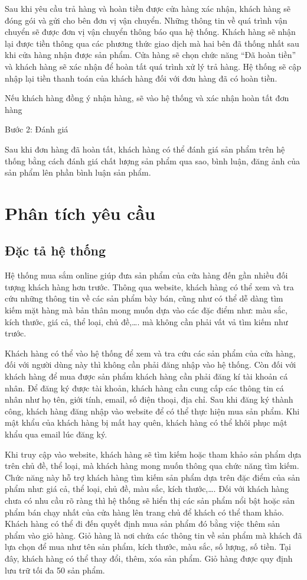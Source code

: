 \documentclass[12pt,a4paper,2sides]{report}
\begin{document}
Sau khi yêu cầu trả hàng và hoàn tiền được cửa hàng xác nhận, khách hàng sẽ đóng gói và gửi cho bên đơn vị vận chuyển. Những thông tin về quá trình vận chuyển sẽ được đơn vị vận chuyển thông báo qua hệ thống. Khách hàng sẽ nhận lại được tiền thông qua các phương thức giao dịch mà hai bên đã thống nhất sau khi cửa hàng nhận được sản phẩm. Cửa hàng sẽ chọn chức năng “Đã hoàn tiền” và khách hàng sẽ xác nhận để hoàn tất quá trình xử lý trả hàng. Hệ thống sẽ cập nhập lại tiền thanh toán của khách hàng đối với đơn hàng đã có hoàn tiền.

Nếu khách hàng đồng ý nhận hàng, sẽ vào hệ thống và xác nhận hoàn tất đơn hàng

Bước 2: Đánh giá

Sau khi đơn hàng đã hoàn tất, khách hàng có thể đánh giá sản phẩm trên hệ thống bằng cách đánh giá chất lượng sản phẩm qua sao, bình luận, đăng ảnh của sản phẩm lên phần bình luận sản phẩm.

\section{Phân tích yêu cầu}
\subsection{Đặc tả hệ thống}
Hệ thống mua sắm online giúp đưa sản phẩm của cửa hàng đến gần nhiều đối tượng khách hàng hơn trước. Thông qua website, khách hàng có thể xem và tra cứu những thông tin về các sản phẩm bày bán, cũng như có thể dễ dàng tìm kiếm mặt hàng mà bản thân mong muốn dựa vào các đặc điểm như: màu sắc, kích thước, giá cả, thể loại, chủ đề,…. mà không cần phải vất vả tìm kiếm như trước.

Khách hàng có thể vào hệ thống để xem và tra cứu các sản phẩm của cửa hàng, đối với người dùng này thì không cần phải đăng nhập vào hệ thống. Còn đối với khách hàng để mua được sản phẩm khách hàng cần phải đăng kí tài khoản cá nhân. Để đăng ký được tài khoản, khách hàng cần cung cấp các thông tin cá nhân như họ tên, giới tính, email, số điện thoại, địa chỉ. Sau khi đăng ký thành công, khách hàng đăng nhập vào website để có thể thực hiện mua sản phẩm. Khi mật khẩu của khách hàng bị mất hay quên, khách hàng có thể khôi phục mật khẩu qua email lúc đăng ký.

Khi truy cập vào website, khách hàng sẽ tìm kiếm hoặc tham khảo sản phẩm dựa trên chủ đề, thể loại, mà khách hàng mong muốn thông qua chức năng tìm kiếm. Chức năng này hỗ trợ khách hàng tìm kiếm sản phẩm dựa trên đặc điểm của sản phẩm như: giá cả, thể loại, chủ đề, màu sắc, kích thước,…. Đối với khách hàng chưa có nhu cầu rõ ràng thì hệ thống sẽ hiển thị các sản phẩm nổi bật hoặc sản phẩm bán chạy nhất của cửa hàng lên trang chủ để khách có thể tham khảo. Khách hàng có thể đi đến quyết định mua sản phẩm đó bằng việc thêm sản phẩm vào giỏ hàng. Giỏ hàng là nơi chứa các thông tin về sản phẩm mà khách đã lựa chọn để mua như tên sản phẩm, kích thước, màu sắc, số lượng, số tiền. Tại đây, khách hàng có thể thay đổi, thêm, xóa sản phẩm. Giỏ hàng được quy định lưu trữ tối đa 50 sản phẩm.
\end{document}
